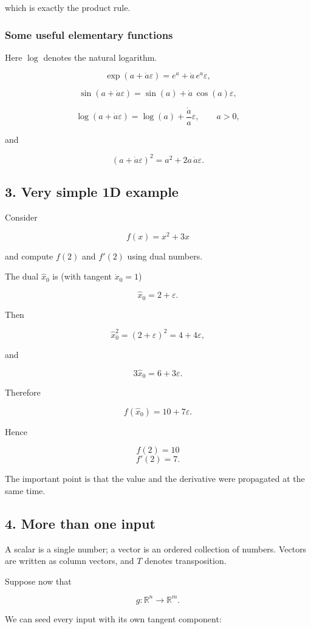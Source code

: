 \documentclass[10pt]{article}
\begin{document}
which is exactly the product rule.

\subsubsection*{Some useful elementary functions}
Here $\log$ denotes the natural logarithm.

\[
\exp(a+\dot{a}\varepsilon)
= e^a+\dot{a}\,e^a\varepsilon,
\]

\[
\sin(a+\dot{a}\varepsilon)
= \sin(a)+\dot{a}\,\cos(a)\varepsilon,
\]

\[
\log(a+\dot{a}\varepsilon)
= \log(a)+\frac{\dot{a}}{a}\varepsilon,
\qquad a>0,
\]

and

\[
(a+\dot{a}\varepsilon)^2
= a^2+2a\,\dot{a}\varepsilon.
\]

\subsection*{3. Very simple 1D example}
Consider

\[
f(x)=x^2+3x
\]

and compute $f(2)$ and $f'(2)$ using dual numbers.

The dual $\hat{x}_0$ is (with tangent $\dot{x}_0=1$)

\[
\hat{x}_0=2+\varepsilon.
\]

Then

\[
\hat{x}_0^2=(2+\varepsilon)^2
=4+4\varepsilon,
\]

and

\[
3\hat{x}_0=6+3\varepsilon.
\]

Therefore

\[
f(\hat{x}_0)
=10+7\varepsilon.
\]

Hence

\[
f(2)=10
\]
\[
f'(2)=7.
\]

The important point is that the value and the derivative were propagated at the same time.

\subsection*{4. More than one input}
A scalar is a single number; a vector is an ordered collection of numbers. Vectors are written as column vectors, and $T$ denotes transposition.

Suppose now that

\[
g:\mathbb{R}^n\to\mathbb{R}^m.
\]

We can seed every input with its own tangent component:
\end{document}
